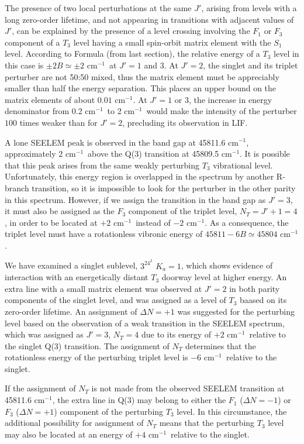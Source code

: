 \documentclass[12pt]{mitthesis}
\newcommand{\rcm}{cm$^{-1}$}
\newcommand{\Ka}[1]{$K_a\!\!=\!#1$}
\begin{document}
The presence of two local perturbations at the same $J'$, arising from
levels with a long zero-order lifetime, and not appearing in
transitions with adjacent values of $J'$, can be explained by the
presence of a level crossing involving the $F_1$ or $F_3$ component of
a $T_3$ level having a small spin-orbit matrix element with the $S_1$
level.  According to Formula (from last section), the relative energy
of a $T_3$ level in this case is $\pm 2B \simeq \pm 2$ \rcm\ at $J'=1$
and $3$.  At $J'=2$, the singlet and its triplet perturber are not
50:50 mixed, thus the matrix element must be appreciably smaller than
half the energy separation.  This places an upper bound on the matrix
elements of about $0.01$ \rcm.  At $J'=1$ or $3$, the increase in
energy denominator from 0.2 \rcm\ to 2 \rcm\ would make the intensity
of the perturber $100$ times weaker than for $J'=2$, precluding its
observation in LIF.

A lone SEELEM peak is observed in the band gap at 45811.6 \rcm,
approximately 2 \rcm\ above the Q(3) transition at 45809.5 \rcm.  It
is possible that this peak arises from the same weakly perturbing
$T_3$ vibrational level.  Unfortunately, this energy region is
overlapped in the spectrum by another R-branch transition, so it is
impossible to look for the perturber in the other parity in this
spectrum.  However, if we assign the transition in the band gap as
$J'=3$, it must also be assigned as the $F_3$ component of the triplet
level, $N_T=J'+1=4$, in order to be located at $+2$ \rcm\ instead of
$-2$ \rcm.  As a consequence, the triplet level must have a
rotationless vibronic energy of $45811 - 6B \simeq 45804$ \rcm.

We have examined a singlet sublevel, $3^24^2$ \Ka{1}, which shows
evidence of interaction with an energetically distant $T_3$ doorway
level at higher energy.  An extra line with a small matrix element was
observed at $J'=2$ in both parity components of the singlet level, and
was assigned as a level of $T_3$ baased on its zero-order lifetime.
An assignment of $\Delta N=+1$ was suggested for the perturbing level
based on the observation of a weak transition in the SEELEM spectrum,
which was assigned as $J'=3$, $N_T=4$ due to its energy of $+2$ \rcm\
relative to the singlet Q(3) transition.  The assignment of $N_T$
determines that the rotationless energy of the perturbing triplet
level is $-6$ \rcm\ relative to the singlet. 

If the assignment of $N_T$ is not made from the observed SEELEM
transition at 45811.6 \rcm, the extra line in Q(3) may belong to
either the $F_1$ ($\Delta N = -1$) or $F_3$ ($\Delta N = +1$)
component of the perturbing $T_3$ level.  In this circumstance, the
additional possibility for assignment of $N_T$ means that the
perturbing $T_3$ level may also be located at an energy of $+4$ \rcm\
relative to the singlet.
\end{document}
